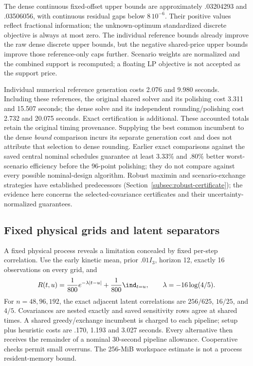 The dense continuous fixed-offset upper bounds are approximately .03204293
and .03506056, with continuous residual gaps below $8\,10^{-6}$. Their
positive values reflect fractional information; the unknown-optimum
standardized discrete objective is always at most zero. The individual
reference bounds already improve the raw dense discrete upper bounds, but the
negative shared-price upper bounds improve those reference-only caps further.
Scenario weights are normalized and the combined support is recomputed;
a floating LP objective is not accepted as the support price.

Individual numerical reference generation costs 2.076 and 9.980 seconds.
Including these references, the original shared solver and its polishing cost
3.311 and 15.507 seconds; the dense solve and its independent rounding/polishing
cost 2.732 and 20.075 seconds. Exact certification is additional. These accounted
totals retain the original timing provenance. Supplying the best common
incumbent to the dense \emph{bound} comparison incurs its separate generation
cost and does not attribute that selection to dense rounding. Earlier exact
comparisons against the saved central nominal schedules guarantee at least
3.33\% and .80\% better worst-scenario efficiency before the 96-point polishing;
they do not compare against every possible nominal-design algorithm.
Robust maximin and scenario-exchange strategies have established predecessors
(Section~\ref{subsec:robust-certificate}); the evidence here concerns the
selected-covariance certificates and their uncertainty-normalized guarantees.

\subsection{Fixed physical grids and latent separators}\label{subsec:grid-experiments}

A fixed physical process reveals a limitation concealed by fixed per-step
correlation. Use the early kinetic mean, prior $.01I_3$, horizon 12, exactly
16 observations on every grid, and
\begin{equation}\label{eq:fixed-physical-covariance}
 R(t,u)=\frac1{800}e^{-\lambda|t-u|}
       +\frac1{800}\ind_{t=u},\qquad \lambda=-16\log(4/5).
\end{equation}
For $n=48,96,192$, the exact adjacent latent correlations are
$256/625$, $16/25$, and $4/5$. Covariances are nested exactly and saved
sensitivity rows agree at shared times. A shared greedy/exchange incumbent is
charged to each pipeline; setup plus heuristic costs are .170, 1.193 and
3.027 seconds. Every alternative then receives the remainder of a nominal
30-second pipeline allowance. Cooperative checks permit small overruns.
The 256-MiB workspace estimate is not a process resident-memory bound.

